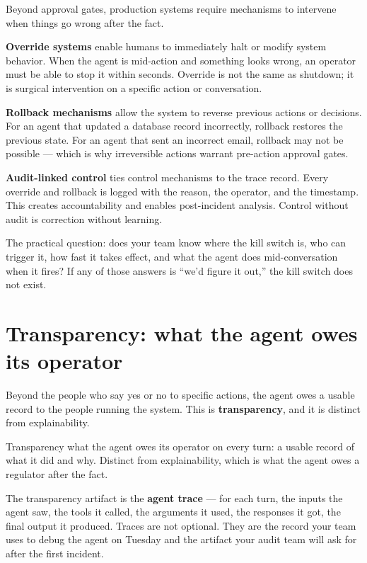 Beyond approval gates, production systems require mechanisms to intervene when things go wrong after the fact.

\textbf{Override systems} enable humans to immediately halt or modify system behavior. When the agent is mid-action and something looks wrong, an operator must be able to stop it within seconds. Override is not the same as shutdown; it is surgical intervention on a specific action or conversation.

\textbf{Rollback mechanisms} allow the system to reverse previous actions or decisions. For an agent that updated a database record incorrectly, rollback restores the previous state. For an agent that sent an incorrect email, rollback may not be possible --- which is why irreversible actions warrant pre-action approval gates.

\textbf{Audit-linked control} ties control mechanisms to the trace record. Every override and rollback is logged with the reason, the operator, and the timestamp. This creates accountability and enables post-incident analysis. Control without audit is correction without learning.

The practical question: does your team know where the kill switch is, who can trigger it, how fast it takes effect, and what the agent does mid-conversation when it fires? If any of those answers is ``we'd figure it out,'' the kill switch does not exist.

\section{Transparency: what the agent owes its operator}

Beyond the people who say yes or no to specific actions, the agent owes a usable record to the people running the system. This is \textbf{transparency}, and it is distinct from explainability.

\begin{TNdefinition}{Transparency} what the agent owes its operator on every turn: a usable record of what it did and why. Distinct from explainability, which is what the agent owes a regulator after the fact. \end{TNdefinition}

The transparency artifact is the \textbf{agent trace} --- for each turn, the inputs the agent saw, the tools it called, the arguments it used, the responses it got, the final output it produced. Traces are not optional. They are the record your team uses to debug the agent on Tuesday and the artifact your audit team will ask for after the first incident.

